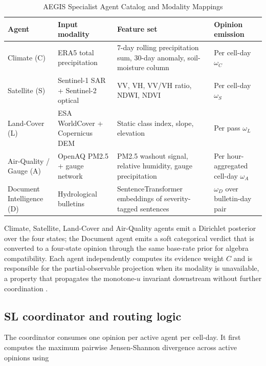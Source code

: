 \begin{table}[htbp]
\caption{AEGIS Specialist Agent Catalog and Modality Mappings}
\label{tab:agent_catalog}
\centering
\small
\renewcommand{\arraystretch}{1.35}
\begin{tabularx}{\linewidth}{p{2.8cm} p{3.2cm} X p{3.2cm}}
\toprule
\textbf{Agent} & \textbf{Input modality} & \textbf{Feature set} & \textbf{Opinion emission} \\
\midrule
Climate (C) & ERA5 total precipitation & 7-day rolling precipitation sum, 30-day anomaly, soil-moisture column & Per cell-day $\omega_C$ \\ \addlinespace[0.4em]
Satellite (S) & Sentinel-1 SAR + Sentinel-2 optical & VV, VH, VV/VH ratio, NDWI, NDVI & Per cell-day $\omega_S$ \\ \addlinespace[0.4em]
Land-Cover (L) & ESA WorldCover + Copernicus DEM & Static class index, slope, elevation & Per pass $\omega_L$ \\ \addlinespace[0.4em]
Air-Quality / Gauge (A) & OpenAQ PM2.5 + gauge network & PM2.5 washout signal, relative humidity, gauge precipitation & Per hour-aggregated cell-day $\omega_A$ \\ \addlinespace[0.4em]
Document Intelligence (D) & Hydrological bulletins & SentenceTransformer embeddings of severity-tagged sentences & $\omega_D$ over bulletin-day pair \\
\bottomrule
\end{tabularx}
\end{table}

Climate, Satellite, Land-Cover and Air-Quality agents emit a Dirichlet posterior over the four states; the Document agent emits a soft categorical verdict that is converted to a four-state opinion through the same base-rate prior for algebra compatibility. Each agent independently computes its evidence weight $C$ and is responsible for the partial-observable projection when its modality is unavailable, a property that propagates the monotone-$u$ invariant downstream without further coordination \citep{kaplan2015partial}.

\subsection{SL coordinator and routing logic}

The coordinator consumes one opinion per active agent per cell-day. It first computes the maximum pairwise Jensen-Shannon divergence across active opinions using

